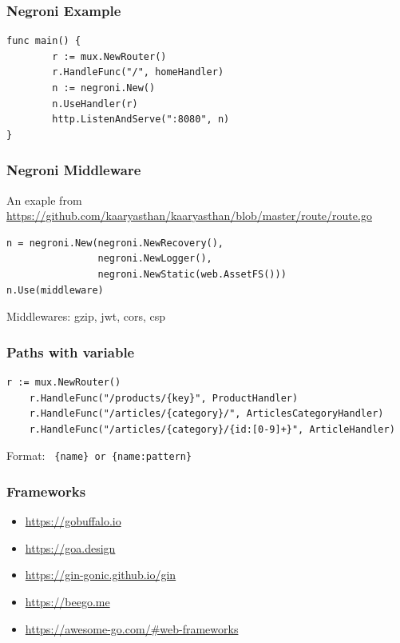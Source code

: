 \documentclass[aspectratio=169]{beamer}
\begin{document}
\begin{frame}[fragile]
  \frametitle{Negroni Example}

\begin{Verbatim}[fontsize=\small]
func main() {
        r := mux.NewRouter()
        r.HandleFunc("/", homeHandler)
        n := negroni.New()
        n.UseHandler(r)
        http.ListenAndServe(":8080", n)
}
\end{Verbatim}
\end{frame}

\begin{frame}[fragile]
  \frametitle{Negroni Middleware}

  An exaple from \small{\url{https://github.com/kaaryasthan/kaaryasthan/blob/master/route/route.go}}
  
\begin{Verbatim}[fontsize=\small]
n = negroni.New(negroni.NewRecovery(),
                negroni.NewLogger(),
                negroni.NewStatic(web.AssetFS()))
n.Use(middleware)
\end{Verbatim}
Middlewares: gzip, jwt, cors, csp
\end{frame}


\begin{frame}[fragile]
  \frametitle{Paths with variable}

  \begin{Verbatim}[fontsize=\small]
    r := mux.NewRouter()
    r.HandleFunc("/products/{key}", ProductHandler)
    r.HandleFunc("/articles/{category}/", ArticlesCategoryHandler)
    r.HandleFunc("/articles/{category}/{id:[0-9]+}", ArticleHandler)
\end{Verbatim}

  Format:
  \texttt{ \{name\} or \{name:pattern\}}

\end{frame}

\begin{frame}[fragile]
  \frametitle{Frameworks}

  \begin{itemize}
  \item \url{https://gobuffalo.io}
  \item \url{https://goa.design}
  \item \url{https://gin-gonic.github.io/gin}
  \item \url{https://beego.me}
  \item \url{https://awesome-go.com/#web-frameworks}
  \end{itemize}

\end{frame}
\end{document}
